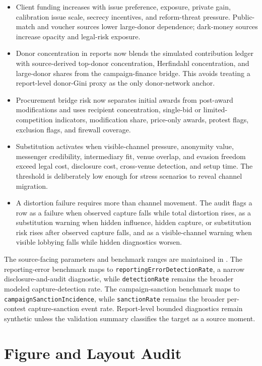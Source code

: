 \begin{itemize}
  \item Client funding increases with issue preference, exposure, private gain, calibration issue scale, secrecy incentives, and reform-threat pressure. Public-match and voucher sources lower large-donor dependence; dark-money sources increase opacity and legal-risk exposure.
  \item Donor concentration in reports now blends the simulated contribution ledger with source-derived top-donor concentration, Herfindahl concentration, and large-donor shares from the campaign-finance bridge. This avoids treating a report-level donor-Gini proxy as the only donor-network anchor.
  \item Procurement bridge risk now separates initial awards from post-award modifications and uses recipient concentration, single-bid or limited-competition indicators, modification share, price-only awards, protest flags, exclusion flags, and firewall coverage.
  \item Substitution activates when visible-channel pressure, anonymity value, messenger credibility, intermediary fit, venue overlap, and evasion freedom exceed legal cost, disclosure cost, cross-venue detection, and setup time. The threshold is deliberately low enough for stress scenarios to reveal channel migration.
  \item A distortion failure requires more than channel movement. The audit flags a row as a failure when observed capture falls while total distortion rises, as a substitution warning when hidden influence, hidden capture, or substitution risk rises after observed capture falls, and as a visible-channel warning when visible lobbying falls while hidden diagnostics worsen.
\end{itemize}

The source-facing parameters and benchmark ranges are maintained in . The reporting-error benchmark maps to \texttt{reportingErrorDetectionRate}, a narrow disclosure-and-audit diagnostic, while \texttt{detectionRate} remains the broader modeled capture-detection rate. The campaign-sanction benchmark maps to \texttt{campaignSanctionIncidence}, while \texttt{sanctionRate} remains the broader per-contest capture-sanction event rate. Report-level bounded diagnostics remain synthetic unless the validation summary classifies the target as a source moment.

\section{Figure and Layout Audit}

